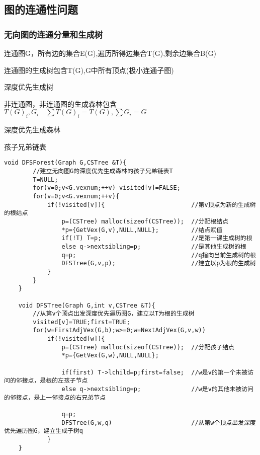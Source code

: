 \documentclass[UTF8]{ctexart}
\newcommand{\q}{\quad}
\newcommand{\qa}{\vspace{12 pt}}
\begin{document}
\subsection{图的连通性问题}

\subsubsection{无向图的连通分量和生成树}

连通图G，所有边的集合E(G),遍历所得边集合T(G),剩余边集合B(G)

连通图的生成树包含T(G),G中所有顶点(极小连通子图)

深度优先生成树

\qa
非连通图，非连通图的生成森林包含$T(G)_i, G_i \q  \sum T(G)_i=T(G), \sum G_i=G $ 

深度优先生成森林

孩子兄弟链表

\begin{lstlisting}[style=v1]
    void DFSForest(Graph G,CSTree &T){
        //建立无向图G的深度优先生成森林的孩子兄弟链表T
        T=NULL;
        for(v=0;v<G.vexnum;++v) visited[v]=FALSE;
        for(v=0;v<G.vexnum;++v){
            if(!visited[v]){                        //第v顶点为新的生成树的根结点
                p=(CSTree) malloc(sizeof(CSTree));  //分配根结点
                *p={GetVex(G,v),NULL,NULL};         //结点赋值   
                if(!T) T=p;                         //是第一课生成树的根
                else q->nextsibling=p;              //是其他生成树的根
                q=p;                                //q指向当前生成树的根
                DFSTree(G,v,p);                     //建立以p为根的生成树
            }
        }
    }

    void DFSTree(Graph G,int v,CSTree &T){
        //从第v个顶点出发深度优先遍历图G，建立以T为根的生成树
        visited[v]=TRUE;first=TRUE;
        for(w=FirstAdjVex(G,b);w>=0;w=NextAdjVex(G,v,w))
            if(!visited[w]){
                p=(CSTree) malloc(sizeof(CSTree));  //分配孩子结点
                *p={GetVex(G,w),NULL,NULL};

                if(first) T->lchild=p;first=false;  //w是v的第一个未被访问的邻接点，是根的左孩子节点    
                else q->nextsibling=p;              //w是v的其他未被访问的邻接点，是上一邻接点的右兄弟节点     

                q=p;
                DFSTree(G,w,q)                      //从第w个顶点出发深度优先遍历图G，建立生成子树q
            }
    }  
\end{lstlisting}
\end{document}
